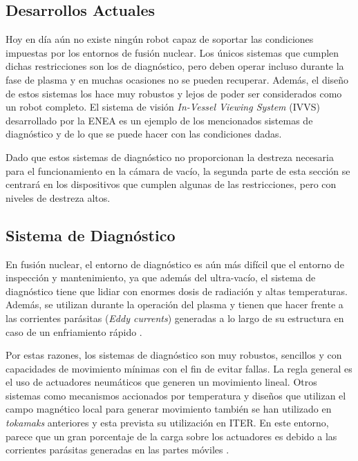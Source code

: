 \subsection*{Desarrollos Actuales}
Hoy en día aún no existe ningún robot capaz de soportar las condiciones impuestas por los entornos de fusión nuclear.
Los únicos sistemas que cumplen dichas restricciones son los de diagnóstico, pero deben operar incluso durante la fase de plasma y en muchas ocasiones no se pueden recuperar. Además, el diseño de estos sistemas los hace muy robustos y lejos de poder ser considerados como un robot completo. El sistema de visión \textit{In-Vessel Viewing System} (IVVS) \cite{Neri2007,Neri2009} desarrollado por la ENEA es un ejemplo de los mencionados sistemas de diagnóstico y de lo que se puede hacer con las condiciones dadas.

Dado que estos sistemas de diagnóstico no proporcionan la destreza necesaria para el funcionamiento en la cámara de vacío, la segunda parte de esta sección se centrará en los dispositivos que cumplen algunas de las restricciones, pero con niveles de destreza altos.

\subsection*{Sistema de Diagnóstico}
En fusión nuclear, el entorno de diagnóstico es aún más difícil que el entorno de inspección y mantenimiento, ya que además del ultra-vacío, el sistema de diagnóstico tiene que lidiar con enormes dosis de radiación y altas temperaturas. Además, se utilizan durante la operación del plasma y tienen que hacer frente a las corrientes parásitas (\textit{Eddy currents}) generadas a lo largo de su estructura en caso de un enfriamiento rápido \cite{Izard2009}.

Por estas razones, los sistemas de diagnóstico son muy robustos, sencillos y con capacidades de movimiento mínimas con el fin de evitar fallas. La regla general es el uso de actuadores neumáticos que generen un movimiento lineal. Otros sistemas como mecanismos accionados por temperatura y diseños que utilizan el campo magnético local para generar movimiento también se han utilizado en \textit{tokamaks} anteriores \cite{Smick2005} y esta prevista su utilización en ITER. En este entorno, parece que un gran porcentaje de la carga sobre los actuadores es debido a las corrientes parásitas generadas en las partes móviles \cite{Izard2009}.

